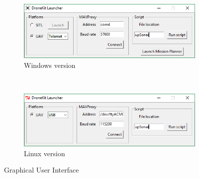 
\begin{figure}[htbp]
	\centering

	\begin{subfigure}[b]{0.7\textwidth}
		\includegraphics[width=\textwidth]{./figures/GUIwin.png}
		\caption{Windows version}
	\end{subfigure}
	~\\[1ex]
	\begin{subfigure}[b]{0.7\textwidth}
		\includegraphics[width=\textwidth]{./figures/GUIlinux.png}
		\caption{Linux version}
	\end{subfigure}

	\caption{Graphical User Interface}
	\label{fig:gui}
\end{figure}

